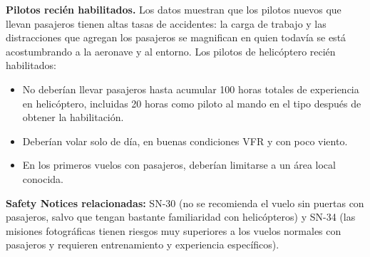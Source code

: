 \textbf{Pilotos recién habilitados.} Los datos muestran que los pilotos nuevos que llevan pasajeros tienen altas tasas de accidentes: la carga de trabajo y las distracciones que agregan los pasajeros se magnifican en quien todavía se está acostumbrando a la aeronave y al entorno. Los pilotos de helicóptero recién habilitados:

\begin{itemize}
\item No deberían llevar pasajeros hasta acumular 100 horas totales de experiencia en helicóptero, incluidas 20 horas como piloto al mando en el tipo después de obtener la habilitación.
\item Deberían volar solo de día, en buenas condiciones VFR y con poco viento.
\item En los primeros vuelos con pasajeros, deberían limitarse a un área local conocida.
\end{itemize}

\textbf{Safety Notices relacionadas:} SN-30 (no se recomienda el vuelo sin puertas con pasajeros, salvo que tengan bastante familiaridad con helicópteros) y SN-34 (las misiones fotográficas tienen riesgos muy superiores a los vuelos normales con pasajeros y requieren entrenamiento y experiencia específicos).
